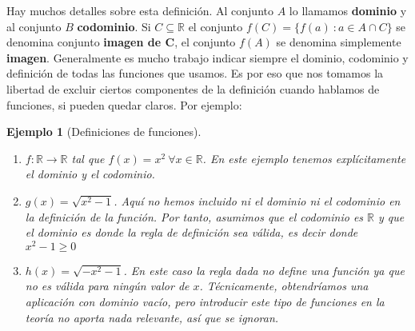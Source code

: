 \documentclass{article}
\newtheorem{ejem}{Ejemplo}
\newcommand{\reales}{\mathbb{R}}
\begin{document}
Hay muchos detalles sobre esta definición. Al conjunto $A$ lo llamamos \textbf{dominio} y al conjunto $B$ \textbf{codominio}. Si $C \subseteq \reales$ el conjunto $f(C) = \{f(a)\ : a \in A \cap C \}$ se denomina conjunto \textbf{imagen de C}, el conjunto $f(A)$ se denomina simplemente \textbf{imagen}. Generalmente es mucho trabajo indicar siempre el dominio, codominio y definición de todas las funciones que usamos. Es por eso que nos tomamos la libertad de excluir ciertos componentes de la definición cuando hablamos de funciones, si pueden quedar claros. Por ejemplo: 

\begin{ejem}[Definiciones de funciones]
	\begin{enumerate}
		\item
		$f:\reales \rightarrow \reales$ tal que $f(x) = x^2\ \forall x \in \reales$. En este ejemplo tenemos explícitamente el dominio y el codominio.
		\item
		$g(x) = \sqrt{x^2 - 1}$. Aquí no hemos incluido ni el dominio ni el codominio en la definición de la función. Por tanto, asumimos que el codominio es $\reales$ y que el dominio es donde la regla de definición sea válida, es decir donde $x^2 - 1 \geq 0$
		\item
		$h(x) = \sqrt{-x^2 - 1}$. En este caso la regla dada no define una función ya que no es válida para ningún valor de $x$. Técnicamente, obtendríamos una aplicación con dominio vacío, pero introducir este tipo de funciones en la teoría no aporta nada relevante, así que se ignoran.
	\end{enumerate}
\end{ejem}
\end{document}
